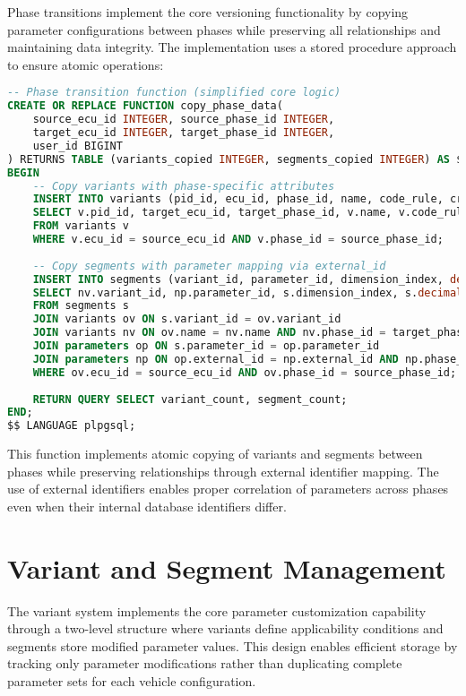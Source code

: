 Phase transitions implement the core versioning functionality by copying parameter configurations between phases while preserving all relationships and maintaining data integrity. The implementation uses a stored procedure approach to ensure atomic operations:

\begin{lstlisting}[language=SQL, caption={Phase Transition Core Logic}, label={lst:phase-transition}]
-- Phase transition function (simplified core logic)
CREATE OR REPLACE FUNCTION copy_phase_data(
    source_ecu_id INTEGER, source_phase_id INTEGER,
    target_ecu_id INTEGER, target_phase_id INTEGER,
    user_id BIGINT
) RETURNS TABLE (variants_copied INTEGER, segments_copied INTEGER) AS $$
BEGIN
    -- Copy variants with phase-specific attributes
    INSERT INTO variants (pid_id, ecu_id, phase_id, name, code_rule, created_by)
    SELECT v.pid_id, target_ecu_id, target_phase_id, v.name, v.code_rule, user_id
    FROM variants v
    WHERE v.ecu_id = source_ecu_id AND v.phase_id = source_phase_id;
    
    -- Copy segments with parameter mapping via external_id
    INSERT INTO segments (variant_id, parameter_id, dimension_index, decimal, created_by)
    SELECT nv.variant_id, np.parameter_id, s.dimension_index, s.decimal, user_id
    FROM segments s
    JOIN variants ov ON s.variant_id = ov.variant_id
    JOIN variants nv ON ov.name = nv.name AND nv.phase_id = target_phase_id
    JOIN parameters op ON s.parameter_id = op.parameter_id
    JOIN parameters np ON op.external_id = np.external_id AND np.phase_id = target_phase_id
    WHERE ov.ecu_id = source_ecu_id AND ov.phase_id = source_phase_id;
    
    RETURN QUERY SELECT variant_count, segment_count;
END;
$$ LANGUAGE plpgsql;
\end{lstlisting}

This function implements atomic copying of variants and segments between phases while preserving relationships through external identifier mapping. The use of external identifiers enables proper correlation of parameters across phases even when their internal database identifiers differ.

\section{Variant and Segment Management}
\label{sec:variant-segment-management}

The variant system implements the core parameter customization capability through a two-level structure where variants define applicability conditions and segments store modified parameter values. This design enables efficient storage by tracking only parameter modifications rather than duplicating complete parameter sets for each vehicle configuration.

